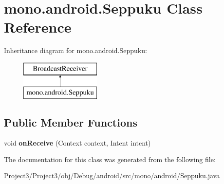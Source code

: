 \hypertarget{classmono_1_1android_1_1Seppuku}{}\section{mono.\+android.\+Seppuku Class Reference}
\label{classmono_1_1android_1_1Seppuku}
Inheritance diagram for mono.\+android.\+Seppuku\+:\begin{figure}[H]
\begin{center}
\leavevmode
\includegraphics[height=2.000000cm]{classmono_1_1android_1_1Seppuku}
\end{center}
\end{figure}
\subsection*{Public Member Functions}
\begin{DoxyCompactItemize}
\item 
\mbox{\label{classmono_1_1android_1_1Seppuku_abf493c6888eae9735c6b1fd052c25a2a}} 
void {\bfseries on\+Receive} (Context context, Intent intent)
\end{DoxyCompactItemize}


The documentation for this class was generated from the following file\+:\begin{DoxyCompactItemize}
\item 
Project3/\+Project3/obj/\+Debug/android/src/mono/android/Seppuku.\+java\end{DoxyCompactItemize}
